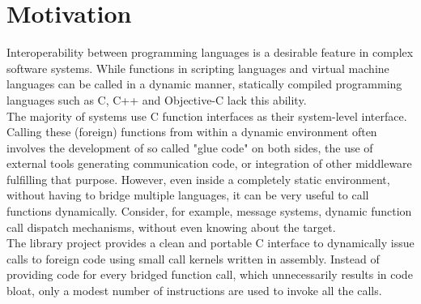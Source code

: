 %
%
%
%

\newpage
\section{Motivation}

Interoperability between programming languages is a desirable feature 
in complex software systems. While functions in scripting languages and virtual machine
languages can be called in a dynamic manner, statically compiled programming
languages such as C, C++ and Objective-C lack this ability.\\
The majority of systems use C function interfaces as their system-level 
interface. Calling these (foreign) functions from within a dynamic environment 
often involves the development of so called "glue code" on both sides,
the use of external tools generating communication code, or integration
of other middleware fulfilling that purpose. However, even inside a completely
static environment, without having to bridge multiple languages, it
can be very useful to call functions dynamically. Consider, for example, message 
systems, dynamic function call dispatch mechanisms, without even knowing about the 
target.\\

The  library project provides a clean and portable C interface
to dynamically issue calls to foreign code using small call kernels written in
assembly. Instead of providing code for every bridged function call, which
unnecessarily results in code bloat, only a modest number of instructions are used
to invoke all the calls.\\

